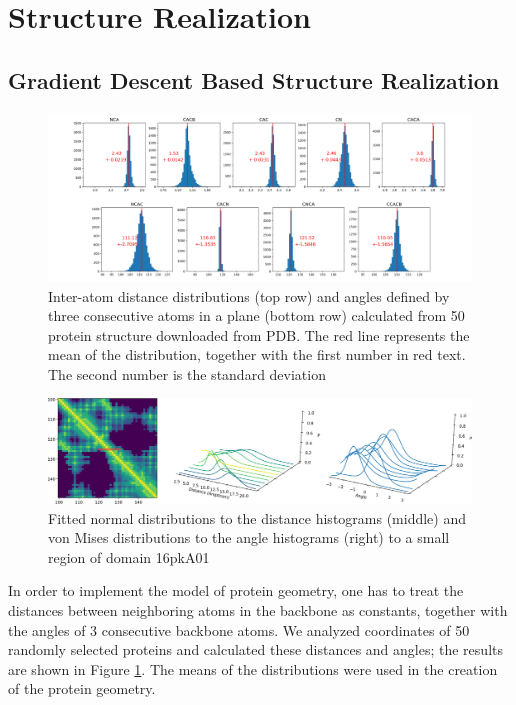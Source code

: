 \section{Structure Realization}

\subsection{Gradient Descent Based Structure Realization}

\begin{figure}
    \centering
    \includegraphics[width=\linewidth]{imgs_tomas/inter_data.png}
    \caption{Inter-atom distance distributions (top row) and angles defined by three consecutive atoms in a plane (bottom row) calculated from 50 protein structure downloaded from PDB. The red line represents the mean of the distribution, together with the first number in red text. The second number is the standard deviation}
    \label{fig:interresidue}
\end{figure}

\begin{figure}
    \centering
    \includegraphics[width=\linewidth]{imgs_tomas/norm_histograms.png}
    \caption{Fitted normal distributions to the distance histograms (middle) and von Mises distributions to the angle histograms (right) to a small region of domain 16pkA01}
    \label{fig:distributions}
\end{figure}

In order to implement the model of protein geometry, one has to treat the distances between neighboring atoms in the backbone as constants, together with the angles of 3 consecutive backbone atoms. We analyzed coordinates of 50 randomly selected proteins and calculated these distances and angles; the results are shown in Figure \ref{fig:interresidue}. The means of the distributions were used in the creation of the protein geometry.

